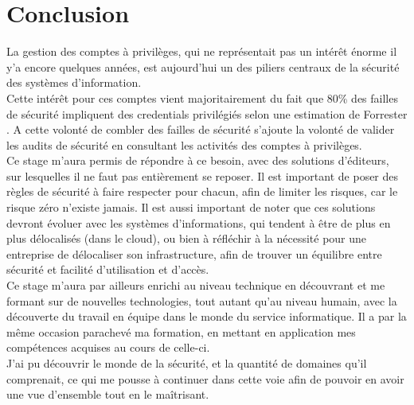 \section*{Conclusion}


La gestion des comptes à privilèges, qui ne représentait pas un intérêt énorme il y'a encore quelques années, est aujourd'hui un des piliers centraux de la sécurité des systèmes d'information.\\
Cette intérêt pour ces comptes vient majoritairement du fait que 80\% des failles de sécurité impliquent des \glspl{credential} privilégiés selon une estimation de Forrester \cite{acs}. A cette volonté de combler des failles de sécurité s'ajoute la volonté de valider les audits de sécurité en consultant les activités des comptes à privilèges.\\
Ce stage m'aura permis de répondre à ce besoin, avec des solutions d'éditeurs, sur lesquelles il ne faut pas entièrement se reposer. Il est important de poser des règles de sécurité à faire respecter pour chacun, afin de limiter les risques, car le risque zéro n'existe jamais. Il est aussi important de noter que ces solutions devront évoluer avec les systèmes d'informations, qui tendent à être de plus en plus délocalisés (dans le cloud), ou bien à réfléchir à la nécessité pour une entreprise de délocaliser son infrastructure, afin de trouver un équilibre entre sécurité et facilité d'utilisation et d'accès.\\
Ce stage m'aura par ailleurs enrichi au niveau technique en découvrant et me formant sur de nouvelles technologies, tout autant qu'au niveau humain, avec la découverte du travail en équipe dans le monde du service informatique. Il a par la même occasion parachevé ma formation, en mettant en application mes compétences acquises au cours de celle-ci.\\
J'ai pu découvrir le monde de la sécurité, et la quantité de domaines qu'il comprenait, ce qui me pousse à continuer dans cette voie afin de pouvoir en avoir une vue d'ensemble tout en le maîtrisant.